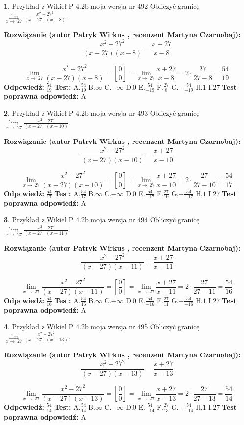\documentclass[12pt, a4paper]{article}
\theoremstyle{definition} %
\newtheorem{zad}{}
\newcommand{\zadStart}[1]{\begin{zad}#1\newline}
\newcommand{\zadStop}{\end{zad}}
\newcommand{\rozwStart}[2]{\noindent \textbf{Rozwiązanie (autor #1 , recenzent #2): }\newline}
\newcommand{\rozwStop}{\newline}
\newcommand{\odpStart}{\noindent \textbf{Odpowiedź:}\newline}
\newcommand{\odpStop}{\newline}
\newcommand{\testStart}{\noindent \textbf{Test:}\newline}
\newcommand{\testStop}{\newline}
\newcommand{\kluczStart}{\noindent \textbf{Test poprawna odpowiedź:}\newline}
\newcommand{\kluczStop}{\newline}
\begin{document}
\zadStart{Przykład z Wikieł P 4.2b moja wersja nr 492}
Obliczyć granicę $\lim\limits_{x\to\ 27}\frac{x^{2}-27^{2}}{(x-27)(x-8)}$.
\zadStop
\rozwStart{Patryk Wirkus}{Martyna Czarnobaj}
$$\frac{x^{2}-27^{2}}{(x-27)(x-8)}=\frac{x+27}{x-8}$$

$$\lim\limits_{x\to\ 27}\frac{x^{2}-27^{2}}{(x-27)(x-8)}=[\frac{0}{0}]=\lim\limits_{x\to\ 27}\frac{x+27}{x-8}=2 \cdot \frac{27}{27-8} = \frac{54}{19}$$
\rozwStop
\odpStart
$\frac{54}{19}$
\odpStop
\testStart
A.$\frac{54}{19}$
B.$\infty$
C.$-\infty$
D.$0$
E.$\frac{54}{-19}$
F.$\frac{27}{8}$
G.$-\frac{54}{-19}$
H.$1$
I.$27$
\testStop
\kluczStart
A
\kluczStop



\zadStart{Przykład z Wikieł P 4.2b moja wersja nr 493}
Obliczyć granicę $\lim\limits_{x\to\ 27}\frac{x^{2}-27^{2}}{(x-27)(x-10)}$.
\zadStop
\rozwStart{Patryk Wirkus}{Martyna Czarnobaj}
$$\frac{x^{2}-27^{2}}{(x-27)(x-10)}=\frac{x+27}{x-10}$$

$$\lim\limits_{x\to\ 27}\frac{x^{2}-27^{2}}{(x-27)(x-10)}=[\frac{0}{0}]=\lim\limits_{x\to\ 27}\frac{x+27}{x-10}=2 \cdot \frac{27}{27-10} = \frac{54}{17}$$
\rozwStop
\odpStart
$\frac{54}{17}$
\odpStop
\testStart
A.$\frac{54}{17}$
B.$\infty$
C.$-\infty$
D.$0$
E.$\frac{54}{-17}$
F.$\frac{27}{10}$
G.$-\frac{54}{-17}$
H.$1$
I.$27$
\testStop
\kluczStart
A
\kluczStop



\zadStart{Przykład z Wikieł P 4.2b moja wersja nr 494}
Obliczyć granicę $\lim\limits_{x\to\ 27}\frac{x^{2}-27^{2}}{(x-27)(x-11)}$.
\zadStop
\rozwStart{Patryk Wirkus}{Martyna Czarnobaj}
$$\frac{x^{2}-27^{2}}{(x-27)(x-11)}=\frac{x+27}{x-11}$$

$$\lim\limits_{x\to\ 27}\frac{x^{2}-27^{2}}{(x-27)(x-11)}=[\frac{0}{0}]=\lim\limits_{x\to\ 27}\frac{x+27}{x-11}=2 \cdot \frac{27}{27-11} = \frac{54}{16}$$
\rozwStop
\odpStart
$\frac{54}{16}$
\odpStop
\testStart
A.$\frac{54}{16}$
B.$\infty$
C.$-\infty$
D.$0$
E.$\frac{54}{-16}$
F.$\frac{27}{11}$
G.$-\frac{54}{-16}$
H.$1$
I.$27$
\testStop
\kluczStart
A
\kluczStop



\zadStart{Przykład z Wikieł P 4.2b moja wersja nr 495}
Obliczyć granicę $\lim\limits_{x\to\ 27}\frac{x^{2}-27^{2}}{(x-27)(x-13)}$.
\zadStop
\rozwStart{Patryk Wirkus}{Martyna Czarnobaj}
$$\frac{x^{2}-27^{2}}{(x-27)(x-13)}=\frac{x+27}{x-13}$$

$$\lim\limits_{x\to\ 27}\frac{x^{2}-27^{2}}{(x-27)(x-13)}=[\frac{0}{0}]=\lim\limits_{x\to\ 27}\frac{x+27}{x-13}=2 \cdot \frac{27}{27-13} = \frac{54}{14}$$
\rozwStop
\odpStart
$\frac{54}{14}$
\odpStop
\testStart
A.$\frac{54}{14}$
B.$\infty$
C.$-\infty$
D.$0$
E.$\frac{54}{-14}$
F.$\frac{27}{13}$
G.$-\frac{54}{-14}$
H.$1$
I.$27$
\testStop
\kluczStart
A
\kluczStop
\end{document}
